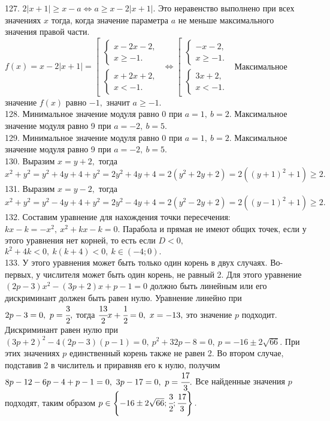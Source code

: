 127. $2|x+1|\geqslant x-a\Leftrightarrow a\geqslant  x-2|x+1|.$ Это неравенство выполнено при всех значениях $x$ тогда, когда значение параметра $a$ не меньше максимального значения правой части. $f(x)=x-2|x+1|=\left[\begin{array}{l}\begin{cases}x-2x-2,\\ x\geqslant -1. \end{cases}\\ \begin{cases}x+2x+2,\\ x< -1. \end{cases}\end{array}\right.\Leftrightarrow\left[\begin{array}{l}\begin{cases}-x-2,\\ x\geqslant -1. \end{cases}\\ \begin{cases}3x+2,\\ x<-1. \end{cases}\end{array}\right.$ Максимальное значение $f(x)$ равно $-1,$ значит $a\geqslant-1.$\\
128. Минимальное значение модуля равно 0 при $a=1,\ b=2.$ Максимальное значение модуля равно 9 при $a=-2,\ b=5.$\\
129. Минимальное значение модуля равно 0 при $a=1,\ b=2.$ Максимальное значение модуля равно 9 при $a=-2,\ b=5.$\\
130. Выразим $x=y+2,$ тогда $x^2+y^2=y^2+4y+4+y^2=2y^2+4y+4=2(y^2+2y+2)=2((y+1)^2+1)\geqslant2.$\\
131. Выразим $x=y-2,$ тогда $x^2+y^2=y^2-4y+4+y^2=2y^2-4y+4=2(y^2-2y+2)=2((y-1)^2+1)\geqslant2.$\\
132. Составим уравнение для нахождения точки пересечения: $kx-k=-x^2,\ x^2+kx-k=0.$ Парабола и прямая не имеют общих точек, если у этого уравнения нет корней, то есть если $D<0,$\\ $k^2+4k<0,\ k(k+4)<0,\ k\in(-4;0).$\\
133. У этого уравнения может быть только один корень в двух случаях. Во-первых, у числителя может быть один корень, не равный 2. Для этого уравнение $(2p-3)x^2-(3p+2)x+p-1=0$ должно быть линейным или его дискриминант должен быть равен нулю. Уравнение линейно при $2p-3=0,\ p=\cfrac{3}{2},$ тогда $\cfrac{13}{2}x+\cfrac{1}{2}=0,\ x=-13,$ это значение $p$ подходит. Дискриминант равен нулю при $(3p+2)^2-4(2p-3)(p-1)=0,\ p^2+32p-8=0,\ p=-16\pm2\sqrt{66}.$ При этих значениях $p$ единственный корень также не равен 2. Во втором случае, подставив 2 в числитель и приравняв его к нулю, получим $8p-12-6p-4+p-1=0,\ 3p-17=0,\ p=\cfrac{17}{3}.$ Все найденные значения $p$ подходят, таким образом $p\in\left\{-16\pm2\sqrt{66};\cfrac{3}{2};\cfrac{17}{3}\right\}.$\\
